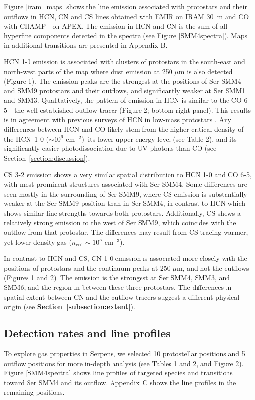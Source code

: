\documentclass{aa}
\begin{document}
Figure \ref{iram_maps} shows the line emission associated with protostars and their outflows in HCN, CN and CS lines obtained with EMIR on IRAM 30~m and CO with CHAMP$^+$ on APEX. 
The emission in HCN and CN is the sum of all hyperfine components detected in the spectra 
(see Figure \ref{SMM4spectra}). Maps in additional transitions are presented in Appendix B.

HCN 1-0 emission is associated with clusters of protostars 
in the south-east and north-west parts of the map where dust emission at 250 $\mu$m is also detected (Figure 1). 
The emission peaks are the strongest at the positions of Ser SMM4 and SMM9 protostars and their outflows,
and significantly weaker at Ser SMM1 and SMM3. Qualitatively, the pattern of emission in
HCN is similar to the CO 6-5 - the well-established outflow tracer (Figure 2; bottom right panel). 
This results is in agreement with previous surveys of HCN in low-mass protostars \citep{Bac01,Wal14}.
Any differences between HCN and CO likely stem from the higher critical density of the 
\mbox{HCN 1-0} ($\sim$$10^6$ cm$^{-2}$), its lower upper energy level (see Table 2), and its 
significantly easier photodissociation due to UV photons than CO (see Section~\ref{section:discussion}). 

CS 3-2 emission shows a very similar spatial distribution to HCN 1-0 and CO 6-5, with most 
prominent structures associated with Ser SMM4. Some differences are seen mostly in the 
surrounding of Ser SMM9, where CS emission is substantially weaker at the Ser SMM9 position 
than in Ser SMM4, in contrast to HCN which shows similar line strengths towards both protostars. 
Additionally, CS shows a relatively strong emission to the west of Ser SMM9, which coincides 
with the outflow from that protostar. The differences may result from CS tracing warmer, yet lower-density gas ($n_\mathrm{crit}\sim$$10^5$ cm$^{-3}$).

In contrast to HCN and CS, CN 1-0 emission is associated more closely with the positions of protostars
and the continuum peaks at 250 $\mu$m, and not the outflows (Figures 1 and 2). The emission is the strongest at
Ser SMM4, SMM3, and SMM6, and the region in between these three protostars. The differences in 
spatial extent between CN and the outflow tracers suggest a different physical origin (see \textbf{Section~\ref{subsection:extent}}).

\subsection{Detection rates and line profiles}
\label{subsection:lines}
To explore gas properties in Serpens, we selected 10 protostellar positions and 5 
outflow positions for more in-depth analysis (see Tables 1 and 2, and Figure 2). Figure \ref{SMM4spectra} shows 
line profiles of targeted species and transitions toward Ser SMM4 and its outflow. Appendix~C shows the line profiles in the remaining positions. 
\end{document}

